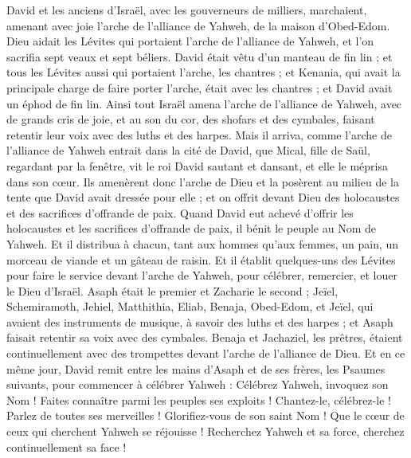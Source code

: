 \begin{multicols}{2}
David et les anciens d'Israël, avec les gouverneurs de milliers, marchaient, amenant avec joie l'arche de l'alliance de Yahweh, de la maison d'Obed-Edom.
Dieu aidait les Lévites qui portaient l'arche de l'alliance de Yahweh, et l'on sacrifia sept veaux et sept béliers.
David était vêtu d'un manteau de fin lin ; et tous les Lévites aussi qui portaient l'arche, les chantres ; et Kenania, qui avait la principale charge de faire porter l'arche, était avec les chantres ; et David avait un éphod de fin lin.
Ainsi tout Israël amena l'arche de l'alliance de Yahweh, avec de grands cris de joie, et au son du cor, des shofars et des cymbales, faisant retentir leur voix avec des luths et des harpes.
Mais il arriva, comme l'arche de l'alliance de Yahweh entrait dans la cité de David, que Mical, fille de Saül, regardant par la fenêtre, vit le roi David sautant et dansant, et elle le méprisa dans son cœur.
\VerseOne{}Ils amenèrent donc l'arche de Dieu et la posèrent au milieu de la tente que David avait dressée pour elle ; et on offrit devant Dieu des holocaustes et des sacrifices d'offrande de paix.
Quand David eut achevé d'offrir les holocaustes et les sacrifices d'offrande de paix, il bénit le peuple au Nom de Yahweh.
Et il distribua à chacun, tant aux hommes qu'aux femmes, un pain, un morceau de viande et un gâteau de raisin.
Et il établit quelques-uns des Lévites pour faire le service devant l'arche de Yahweh, pour célébrer, remercier, et louer le Dieu d'Israël.
Asaph était le premier et Zacharie le second ; Jeïel, Schemiramoth, Jehiel, Matthithia, Eliab, Benaja, Obed-Edom, et Jeïel, qui avaient des instruments de musique, à savoir des luths et des harpes ; et Asaph faisait retentir sa voix avec des cymbales.
Benaja et Jachaziel, les prêtres, étaient continuellement avec des trompettes devant l'arche de l'alliance de Dieu.
Et en ce même jour, David remit entre les mains d'Asaph et de ses frères, les Psaumes suivants, pour commencer à célébrer Yahweh :
Célébrez Yahweh, invoquez son Nom ! Faites connaître parmi les peuples ses exploits !
Chantez-le, célébrez-le ! Parlez de toutes ses merveilles !
Glorifiez-vous de son saint Nom ! Que le cœur de ceux qui cherchent Yahweh se réjouisse !
Recherchez Yahweh et sa force, cherchez continuellement sa face !

\end{multicols}

